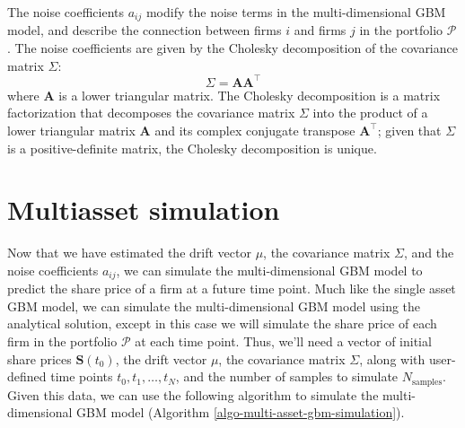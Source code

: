 \documentclass[11pt]{article}
\theoremstyle{definition}
\begin{document}
The noise coefficients $a_{ij}$ modify the noise terms in the multi-dimensional GBM model, 
and describe the connection between firms $i$ and firms $j$ in the portfolio $\mathcal{P}$. 
The noise coefficients are given by the Cholesky decomposition of the covariance matrix $\Sigma$:
\begin{equation*}
\Sigma = \mathbf{A}\mathbf{A}^{\top}
\end{equation*}
where $\mathbf{A}$ is a lower triangular matrix. 
The Cholesky decomposition is a matrix factorization that decomposes the covariance matrix $\Sigma$ 
into the product of a lower triangular matrix $\mathbf{A}$ and its complex conjugate transpose $\mathbf{A}^{\top}$;
given that $\Sigma$ is a positive-definite matrix, the Cholesky decomposition is unique.

\section*{Multiasset simulation}
Now that we have estimated the drift vector $\mu$, the covariance matrix $\Sigma$, and the noise coefficients $a_{ij}$, we can
simulate the multi-dimensional GBM model to predict the share price of a firm at a future time point. 
Much like the single asset GBM model, we can simulate the multi-dimensional GBM model using the analytical solution, 
except in this case we will simulate the share price of each firm in the portfolio $\mathcal{P}$ at each time point.
Thus, we'll need a vector of initial share prices $\mathbf{S}(t_{0})$, the drift vector $\mu$, the covariance matrix $\Sigma$,
along with user-defined time points $t_{0},t_{1},\dots,t_{N}$, and the number of samples to simulate $N_{\text{samples}}$.
Given this data, we can use the following algorithm to simulate the multi-dimensional GBM model (Algorithm \ref{algo-multi-asset-gbm-simulation}).
\end{document}
